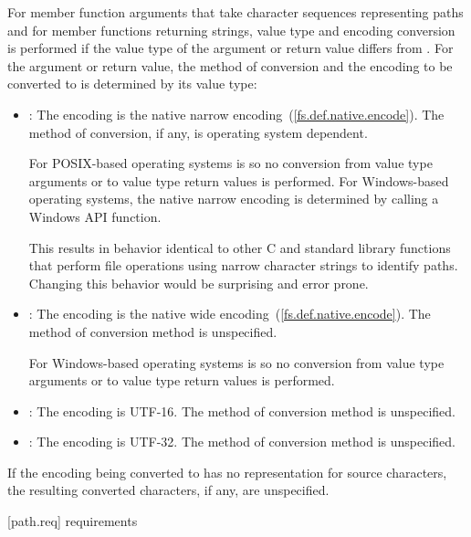 \pnum
For member function arguments that take character sequences representing
paths and for member functions returning strings, value type and encoding
conversion is performed if the value type of the argument or return value differs from
.
For the argument or return value, the method of conversion and the encoding 
to be converted to is determined
by its value type:
\begin{itemize}
\item {}: The encoding is the native narrow encoding~(\ref{fs.def.native.encode}).
The method of conversion, if any, is operating system dependent.
\begin{note}
For POSIX-based operating systems  is 
so no conversion from  value type arguments or to 
value type return values is performed.
For Windows-based operating systems, the
native narrow encoding is determined by calling a Windows API function.
\end{note}
\begin{note}
This results in behavior identical to other C and \Cpp
standard library functions that perform file operations using narrow character
strings to identify paths. Changing this behavior would be surprising and error
prone.
\end{note}
\item {}: The encoding is the native wide encoding~(\ref{fs.def.native.encode}).
The method of conversion method is unspecified.
\begin{note}
For Windows-based operating systems  is 
so no conversion from  value type arguments or to 
value type return values is performed.
\end{note}
\item {}: The encoding is UTF-16. The method of conversion method
is unspecified.
\item {}: The encoding is UTF-32. The method of conversion method
is unspecified.
\end{itemize}

\pnum
If the encoding being converted to has no representation for source
characters, the resulting converted characters, if any, are unspecified.

[path.req]{ requirements}


